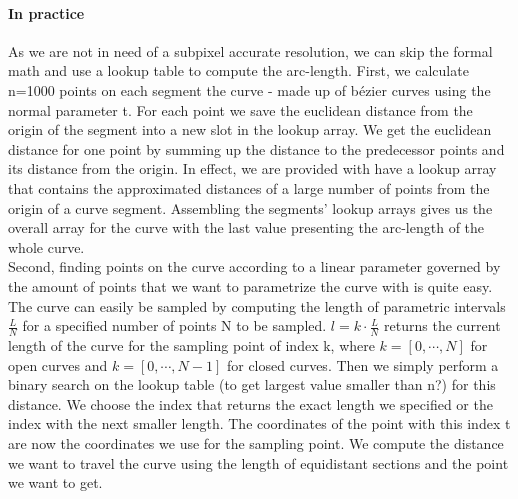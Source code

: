 \paragraph{In practice}
As we are not in need of a subpixel accurate resolution, we can skip the formal math and use a lookup table to compute the arc-length.
First, we calculate n=1000 points on each segment the curve - made up of b\'{e}zier curves using the normal parameter t. For each point we save the euclidean distance from the origin of the segment into a new slot in the lookup array. We get the euclidean distance for one point by summing up the distance to the predecessor points and its distance from the origin.
In effect, we are provided with have a lookup array that contains the approximated distances of a large number of points from the origin of a curve segment. Assembling the segments' lookup arrays gives us the overall array for the curve with the last value presenting the arc-length of the whole curve.\\ 
Second, finding points on the curve according to a linear parameter governed by the amount of points that we want to parametrize the curve with is quite easy. The curve can easily be sampled by computing the length of parametric intervals $\frac{L}{N}$ for a specified number of points N to be sampled. $l=k \cdot \frac{L}{N}$ returns the current length of the curve for the sampling point of index k, where $k=[0,\cdots,N]$ for open curves and $k=[0,\cdots,N-1]$ for closed curves.
Then we simply perform a binary search on the lookup table (to get largest value smaller than n?) for this distance. We choose the index that returns the exact length we specified or the index with the next smaller length. The coordinates of the point with this index t are now the coordinates we use for the sampling point.
We compute the distance we want to travel the curve using the length of equidistant sections and the point we want to get.


